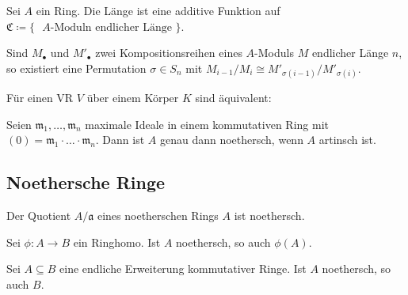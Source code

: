 \documentclass{cheat-sheet}
\newcommand{\SC}{\mathfrak{C}} %
\newcommand{\aaa}{\mathfrak{a}}
\newcommand{\mmm}{\mathfrak{m}}
\begin{document}
\begin{prop}
  Sei $A$ ein Ring.
  Die Länge ist eine additive Funktion auf $\SC \coloneqq \{ \text{ $A$-Moduln endlicher Länge } \}$.
\end{prop}

\begin{satz}
  Sind $M_\bullet$ und $M'_\bullet$ zwei Kompositionsreihen eines $A$-Moduls $M$ endlicher Länge $n$, so existiert eine Permutation $\sigma \in S_n$ mit $M_{i-1}/M_i \cong M'_{\sigma(i-1)}/M'_{\sigma(i)}$.
\end{satz}

\begin{prop}
  Für einen VR $V$ über einem Körper $K$ sind äquivalent:
  \begin{itemize}
  \end{itemize}
\end{prop}

\begin{samepage}

\begin{kor}
  Seien $\mmm_1, \ldots, \mmm_n$ maximale Ideale in einem kommutativen Ring mit $(0) = \mmm_1 \cdot \ldots \cdot \mmm_n$.
  Dann ist $A$ genau dann noethersch, wenn $A$ artinsch ist.
\end{kor}

\subsection{Noethersche Ringe}

\end{samepage}



\begin{prop}
  Der Quotient $A / \aaa$ eines noetherschen Rings $A$ ist noethersch.
\end{prop}

\begin{kor}
  Sei $\phi : A \to B$ ein Ringhomo.
  Ist $A$ noethersch, so auch $\phi(A)$.
\end{kor}

\begin{prop}
  Sei $A \subseteq B$ eine endliche Erweiterung kommutativer Ringe.
  Ist $A$ noethersch, so auch $B$.
\end{prop}
\end{document}
